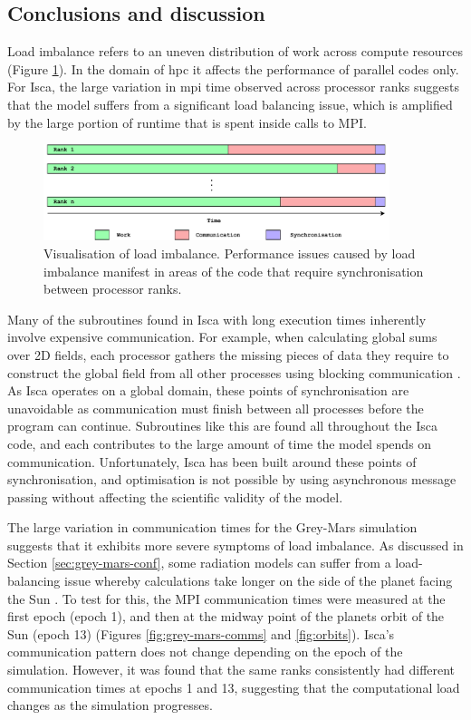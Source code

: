 \documentclass[a4paper,11pt]{report}
\begin{document}
\subsection{Conclusions and discussion}
Load imbalance refers to an uneven distribution of work across compute resources (Figure \ref{fig:load-imbalance}). In the domain of \gls{hpc} it affects the performance of parallel codes only. For Isca, the large variation in \gls{mpi} time observed across processor ranks suggests that the model suffers from a significant load balancing issue, which is amplified by the large portion of runtime that is spent inside calls to MPI.
\par
\begin{figure}[htbp]
\begin{center}
\includegraphics[width=0.9\textwidth]{img/load_imbalance.pdf}
\caption[Visualisation of load imbalance]{Visualisation of load imbalance. Performance issues caused by load imbalance manifest in areas of the code that require synchronisation between processor ranks.}
\label{fig:load-imbalance}
\end{center}
\end{figure}
\par
Many of the subroutines found in Isca with long execution times inherently involve expensive communication. For example, when calculating global sums over 2D fields, each processor gathers the missing pieces of data they require to construct the global field from all other processes using blocking communication \cite{schmidt2007benchmark}. As Isca operates on a global domain, these points of synchronisation are unavoidable as communication must finish between all processes before the program can continue. Subroutines like this are found all throughout the Isca code, and each contributes to the large amount of time the model spends on communication. Unfortunately, Isca has been built around these points of synchronisation, and optimisation is not possible by using asynchronous message passing without affecting the scientific validity of the model. 
\par
The large variation in communication times for the Grey-Mars simulation suggests that it exhibits more severe symptoms of load imbalance. As discussed in Section \ref{sec:grey-mars-conf}, some radiation models can suffer from a load-balancing issue whereby calculations take longer on the side of the planet facing the Sun \cite{foster1994load}. To test for this, the MPI communication times were measured at the first epoch (epoch 1), and then at the midway point of the planets orbit of the Sun (epoch 13) (Figures \ref{fig:grey-mars-comms} and \ref{fig:orbits}). Isca's communication pattern does not change depending on the epoch of the simulation. However, it was found that the same ranks consistently had different communication times at epochs 1 and 13, suggesting that the computational load changes as the simulation progresses. 
\end{document}
